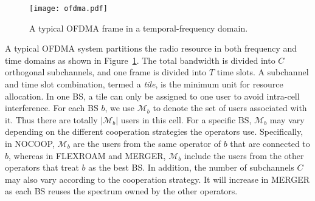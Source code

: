 \documentclass[conference]{IEEEtran}
\begin{document}
\begin{figure}[htbp]
    \vspace{-0.1in}
    \centerline{\texttt{[image: ofdma.pdf]}}
    \caption{
       A typical OFDMA frame in a temporal-frequency domain.
    }
    \label{fig:ofdma}
    \vspace{-0.1in}
\end{figure}
A typical OFDMA system partitions the radio resource in both frequency and time domains as shown in Figure~\ref{fig:ofdma}. The total bandwidth is divided into $C$ orthogonal subchannels, and one frame is divided into $T$ time slots. A subchannel and time slot combination, termed a \textit{tile}, is the minimum unit for resource allocation. In one BS, a tile can only be assigned to one user to avoid intra-cell interference. For each BS $b$, we use $\mathcal{M}_b$ to denote the set of users associated with it. Thus there are totally $|\mathcal{M}_b|$ users in this cell. For a specific BS, $\mathcal{M}_b$ may vary depending on the different cooperation strategies the operators use. Specifically, in NOCOOP, $\mathcal{M}_b$ are the users from the same operator of $b$ that are connected to $b$, whereas in FLEXROAM and MERGER, $\mathcal{M}_b$ include the users from the other operators that treat $b$ as the best BS. In addition, the number of subchannels $C$ may also vary according to the cooperation strategy. It will increase in MERGER as each BS reuses the spectrum owned by the other operators.
\end{document}
